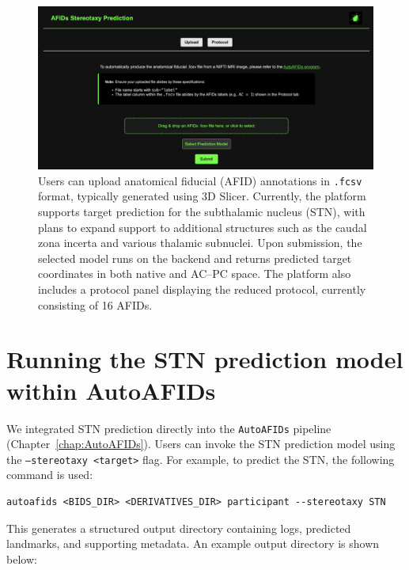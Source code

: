 \begin{figure}[hbt!]
    \centering
    \includegraphics[width=1\linewidth]{figs/figuresupstereotaxy.png}
    \caption{Users can upload anatomical fiducial (AFID) annotations in \texttt{.fcsv} format, typically generated using 3D Slicer. Currently, the platform supports target prediction for the subthalamic nucleus (STN), with plans to expand support to additional structures such as the caudal zona incerta and various thalamic subnuclei. Upon submission, the selected model runs on the backend and returns predicted target coordinates in both native and AC--PC space. The platform also includes a protocol panel displaying the reduced protocol, currently consisting of 16 AFIDs.}
    \label{fig:figuresupstereotaxy}
\end{figure}

\newpage
\section{Running the STN prediction model within AutoAFIDs}\label{app:stereotaxyautoafids}
We integrated STN prediction directly into the \texttt{AutoAFIDs} pipeline (Chapter~\ref{chap:AutoAFIDs}). Users can invoke the STN prediction model using the \texttt{--stereotaxy <target>} flag. For example, to predict the STN, the following command is used:

\begin{verbatim}
autoafids <BIDS_DIR> <DERIVATIVES_DIR> participant --stereotaxy STN
\end{verbatim}

This generates a structured output directory containing logs, predicted landmarks, and supporting metadata. An example output directory is shown below:

